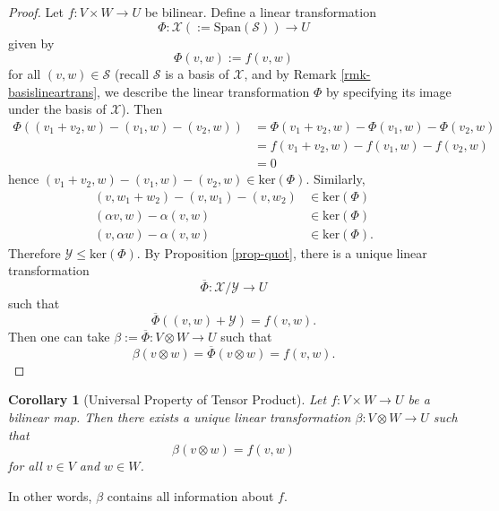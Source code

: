 \documentclass[11pt,openany]{book}
\theoremstyle{plain}
\newtheorem{corollary}[corollary]{Corollary}
\theoremstyle{definition}
\theoremstyle{remark}
\begin{document}
\begin{proof}
    \medskip
    Let $f : V \times W \to U$ be bilinear. Define a linear transformation
    $$\Phi : \mathcal{X} (:= \mathrm{Span}(\mathcal{S})) \to U$$
    given by 
    $$\Phi(v, w) := f(v,w)$$
    for all $(v,w) \in \mathcal{S}$ (recall $\mathcal{S}$ is a basis of $\mathcal{X}$, and by Remark \ref{rmk-basislineartrans}, we describe the linear transformation $\Phi$ by specifying its image under the basis of $\mathcal{X}$). Then 
    \begin{align*}
        \Phi((v_1+v_2, w)-(v_1, w)-(v_2, w)) &= \Phi(v_1+v_2, w)- \Phi(v_1, w)- \Phi(v_2, w) \\
        &= f(v_1+v_2, w)-f(v_1, w)-f(v_2, w) \\
        &= 0
    \end{align*}
    hence $(v_1+v_2, w)-(v_1, w)-(v_2, w) \in \mathrm{ker}(\Phi).$
    Similarly,
    \begin{align*}
        (v, w_1+w_2)-(v, w_1)-(v, w_2) &\in \mathrm{ker}(\Phi) \\
        (\alpha v, w)-\alpha (v, w) &\in \mathrm{ker}(\Phi) \\
        (v, \alpha w)-\alpha (v, w) &\in \mathrm{ker}(\Phi).
    \end{align*}
    Therefore $\mathcal{Y} \leq \mathrm{ker}(\Phi)$.
    By Proposition \ref{prop-quot}, there is a unique linear transformation
    $$\overline{\Phi} : \mathcal{X}/\mathcal{Y} \to U$$
    such that
    $$\overline{\Phi}((v, w)+\mathcal{Y}) = f(v, w).$$
    Then one can take $\beta := \overline{\Phi} : V \otimes W \to U$ such that
    $$\beta(v \otimes w) = \overline{\Phi}(v \otimes w) = f(v, w).$$
\end{proof}

\begin{corollary}[Universal Property of Tensor Product]
    Let $f:V \times W \to U$ be a bilinear map. Then there exists a unique linear transformation $\beta: V\otimes W \to U$ such that 
    $$\beta(v \otimes w) = f(v,w)$$
    for all $v \in V$ and $w \in W$. 
\end{corollary}
In other words, $\beta$ contains all information about $f$.
\end{document}
